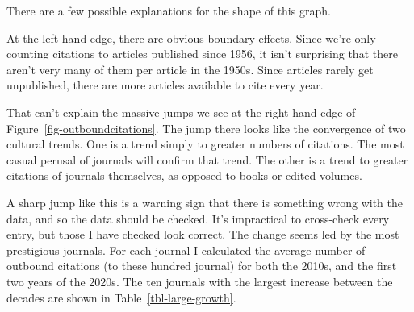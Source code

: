 \documentclass[
]{ergoclass}
\begin{document}
There are a few possible explanations for the shape of this graph.

At the left-hand edge, there are obvious boundary effects. Since we're
only counting citations to articles published since 1956, it isn't
surprising that there aren't very many of them per article in the 1950s.
Since articles rarely get unpublished, there are more articles available
to cite every year.

That can't explain the massive jumps we see at the right hand edge of
Figure~\ref{fig-outboundcitations}. The jump there looks like the
convergence of two cultural trends. One is a trend simply to greater
numbers of citations. The most casual perusal of journals will confirm
that trend. The other is a trend to greater citations of journals
themselves, as opposed to books or edited volumes.

A sharp jump like this is a warning sign that there is something wrong
with the data, and so the data should be checked. It's impractical to
cross-check every entry, but those I have checked look correct. The
change seems led by the most prestigious journals. For each journal I
calculated the average number of outbound citations (to these hundred
journal) for both the 2010s, and the first two years of the 2020s. The
ten journals with the largest increase between the decades are shown in
Table~\ref{tbl-large-growth}.
\end{document}

